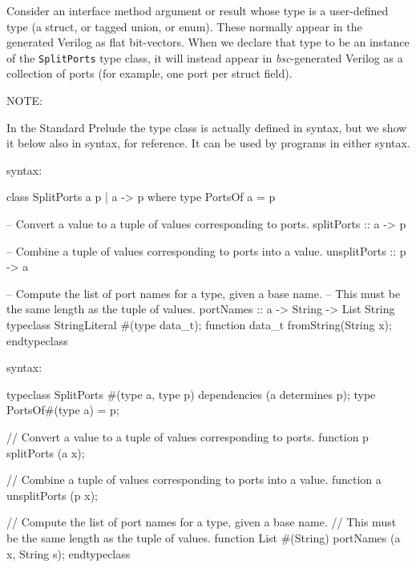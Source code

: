 Consider an interface method argument or result whose type is a
user-defined type (a struct, or tagged union, or enum).  These
normally appear in the generated Verilog as flat bit-vectors.  When we
declare that type to be an instance of the {\tt SplitPorts} type
class, it will instead appear in \emph{bsc}-generated Verilog as a
collection of ports (for example, one port per struct field).

NOTE: \hfill {}

\vspace{1ex}

In the Standard Prelude the type class is actually defined in {\BHb}
syntax, but we show it below also in {\BSVb} syntax, for reference.
It can be used by programs in either syntax.

{\BHb} syntax:
\begin{libverbatim}
   class SplitPorts a p | a -> p where
     type PortsOf a = p

     -- Convert a value to a tuple of values corresponding to ports.
     splitPorts :: a -> p

     -- Combine a tuple of values corresponding to ports into a value.
     unsplitPorts :: p -> a

     -- Compute the list of port names for a type, given a base name.
     -- This must be the same length as the tuple of values.
     portNames :: a -> String -> List String
      typeclass StringLiteral #(type data_t);
          function data_t fromString(String x);
      endtypeclass
\end{libverbatim}

{\BSVb} syntax:
\begin{libverbatim}
   typeclass SplitPorts #(type a, type p)
     dependencies (a determines p);
     type PortsOf#(type a) = p;

     // Convert a value to a tuple of values corresponding to ports.
     function p splitPorts (a x);

     // Combine a tuple of values corresponding to ports into a value.
     function a unsplitPorts (p x);

     // Compute the list of port names for a type, given a base name.
     // This must be the same length as the tuple of values.
     function List #(String) portNames (a x, String s);
   endtypeclass
\end{libverbatim}

